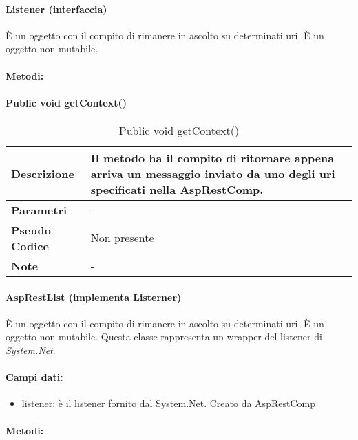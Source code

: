 \paragraph{Listener (interfaccia)}
È un oggetto con il compito di rimanere in ascolto su determinati uri. È un oggetto non mutabile.
\paragraph{Metodi:}
\paragraph{Public void getContext()}
    \begin{center}
        \begin{longtable}{|p{3cm}|p{9cm}|}%
        \caption{Public void getContext()}
        \label{tab:public-void-getContext}
        \endfirsthead
        \endhead
        \hline
        \textbf{Descrizione} & Il metodo ha il compito di ritornare appena arriva un messaggio inviato da uno degli uri specificati nella AspRestComp. \\
        \hline
        \textbf{Parametri} &      
            -
        \\
        \hline
        \textbf{Pseudo Codice} & 
         Non presente \\
        \hline
        \textbf{Note} & - \\
        \hline
        \end{longtable}
        \end{center}


\paragraph{AspRestList (implementa Listerner)}
È un oggetto con il compito di rimanere in ascolto su determinati uri. È un oggetto non mutabile. Questa classe rappresenta un wrapper del listener di \emph{System.Net}.
\paragraph{Campi dati:}
\begin{itemize}
    \item listener: è il listener fornito dal System.Net. Creato da AspRestComp
\end{itemize}

\paragraph{Metodi:}
